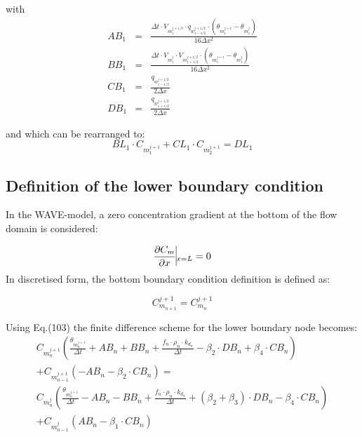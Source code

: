 with
\begin{eqnarray}
AB_1 &=& \frac{\Delta t \cdot V_m_1^{j+1/2} \cdot q_w_{1-1/2}^{j+1/2} \cdot(\theta_m_1^{j+1} - \theta_m_1^{j})}{16 \Delta x^2}\\ 
\nonumber
BB_1 &=& \frac{\Delta t \cdot V_m_1^{j}\cdot V_m_{1+1/2}^{j+1/2} \cdot (\theta_m_1^{j+1} - \theta_m_1^{j})}{16 \Delta x^2} \\
\nonumber
CB_1 &=& \frac{q_w_{1-1/2}^{j+1/2}}{2\Delta x}\\
\nonumber
DB_1 &=& \frac{q_w_{1+1/2}^{j+1/2}}{2\Delta x}
\end{eqnarray}
	

and which can be rearranged to:
\begin{equation}
BL_1 \cdot C_m_1^{j+1} + CL_1 \cdot C_m_2^{j+1} = DL_1
\end{equation}

\subsection{Definition of the lower boundary condition}

In the WAVE-model, a zero concentration gradient at the bottom of the flow domain is considered:

\begin{equation}
\frac{\partial C_m}{\partial x} \vline_{x=L} = 0
\end{equation}
In discretised form, the bottom boundary condition definition is defined as:

\begin{equation}
C_{m_{n+1}}^{j+1} = C_{m_{n}}^{j+1}
\end{equation}

Using Eq.(103) the finite difference scheme for the lower boundary node becomes:
\begin{equation}
\begin{split}
C_m_n^{j+1}\left(\frac{\theta_m_n^{j+1}}{\Delta t} + AB_n + BB_n + \frac{f_n\cdot \rho_n \cdot k_d_n}{\Delta t} - \beta_2\cdot DB_n + \beta_4 \cdot CB_n \right)\\
+ C_m_{n-1}^{j+1}(-AB_n - \beta_2 \cdot CB_n) = \\
C_m_n^{j}\left(\frac{\theta_m_n^{j+1}}{\Delta t} - AB_n - BB_n + \frac{f_n\cdot \rho_n \cdot k_d_n}{\Delta t} + (\beta_2 + \beta_3) \cdot DB_n - \beta_4 \cdot CB_n \right)\\
+ C_m_{n-1}^{j}(AB_n - \beta_1\cdot CB_n)
\end{split}
\end{equation}

